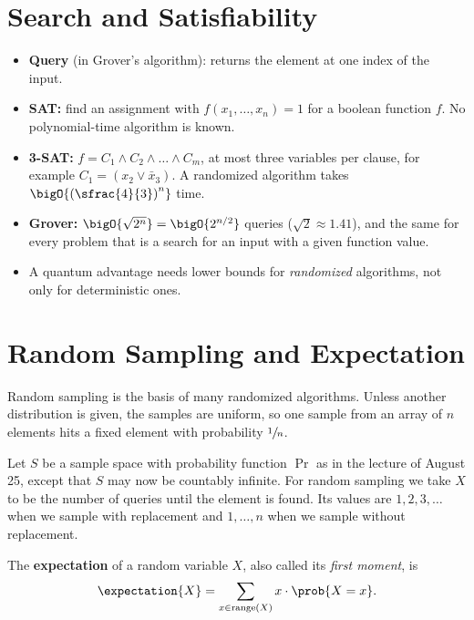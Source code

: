 
\section{Search and Satisfiability}

\begin{itemize}
    \item \textbf{Query} (in Grover's algorithm): returns the element at one index of the input.
    \item \textbf{SAT:} find an assignment with $f(x_1, \dots, x_n) = 1$ for a boolean function
          $f$. No polynomial-time algorithm is known.
    \item \textbf{3-SAT:} $f = C_1 \wedge C_2 \wedge \dots \wedge C_m$, at most three variables per
          clause, for example $C_1 = (x_2 \vee \bar{x}_3)$. A randomized algorithm takes
          $\bigO{\left(\sfrac{4}{3}\right)^n}$ time.
    \item \textbf{Grover:} $\bigO{\sqrt{2^n}} = \bigO{2^{n/2}}$ queries ($\sqrt{2} \approx 1.41$),
          and the same for every problem that is a search for an input with a given function value.
    \item A quantum advantage needs lower bounds for \emph{randomized} algorithms, not only for
          deterministic ones.
\end{itemize}

\section{Random Sampling and Expectation}

Random sampling is the basis of many randomized algorithms. Unless another distribution is given, the
samples are uniform, so one sample from an array of $n$ elements hits a fixed element with
probability $\sfrac{1}{n}$.

Let $S$ be a sample space with probability function $\Pr$ as in the lecture of August 25, except
that $S$ may now be countably infinite. For random sampling we take $X$ to be the number of queries until the element is found.
Its values are $1, 2, 3, \dots$ when we sample with replacement and $1, \dots, n$ when we sample
without replacement.

\begin{definition}[Expectation]\label{def:expectation-0827}
    The \textbf{expectation} of a random variable $X$, also called its \emph{first moment}, is
    \[\expectation{X} = \sum_{x \in \operatorname{range}(X)} x \cdot \prob{X = x}.\]
\end{definition}


